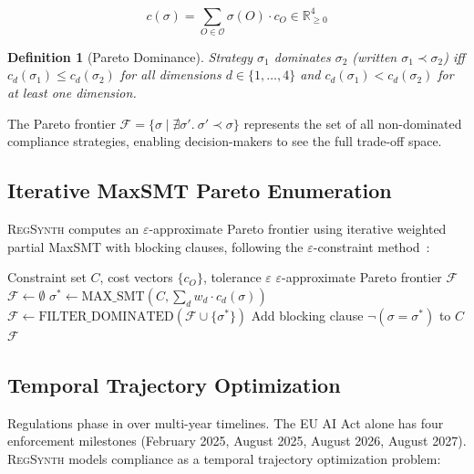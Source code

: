 \documentclass[11pt,twocolumn]{article}
\newtheorem{definition}{Definition}
\newcommand{\regsynth}{\textsc{RegSynth}}
\begin{document}
\[
c(\sigma) = \sum_{O \in \mathcal{O}} \sigma(O) \cdot c_O \in \mathbb{R}^4_{\geq 0}
\]

\begin{definition}[Pareto Dominance]
Strategy $\sigma_1$ \emph{dominates} $\sigma_2$ (written $\sigma_1 \prec \sigma_2$)
iff $c_d(\sigma_1) \leq c_d(\sigma_2)$ for all dimensions $d \in \{1,\ldots,4\}$
and $c_d(\sigma_1) < c_d(\sigma_2)$ for at least one dimension.
\end{definition}

The Pareto frontier $\mathcal{F} = \{\sigma \mid \nexists \sigma'.\ \sigma' \prec \sigma\}$
represents the set of all non-dominated compliance strategies, enabling
decision-makers to see the full trade-off space.

\subsection{Iterative MaxSMT Pareto Enumeration}

\regsynth{} computes an $\varepsilon$-approximate Pareto frontier using iterative
weighted partial MaxSMT with blocking clauses, following the $\varepsilon$-constraint
method~\cite{ehrgott2005,papadimitriou2000}:

\begin{algorithm}[t]
\caption{$\varepsilon$-Approximate Pareto Frontier via MaxSMT}
\label{alg:pareto}
\begin{algorithmic}[1]
\Require Constraint set $C$, cost vectors $\{c_O\}$, tolerance $\varepsilon$
\Ensure $\varepsilon$-approximate Pareto frontier $\mathcal{F}$
\State $\mathcal{F} \gets \emptyset$
  \State $\sigma^* \gets \text{MAX\_SMT}(C, \sum_d w_d \cdot c_d(\sigma))$
    \State $\mathcal{F} \gets \text{FILTER\_DOMINATED}(\mathcal{F} \cup \{\sigma^*\})$
  \EndIf
  \State Add blocking clause $\neg(\sigma = \sigma^*)$ to $C$
\EndFor
\State \Return $\mathcal{F}$
\end{algorithmic}
\end{algorithm}

\subsection{Temporal Trajectory Optimization}
\label{sec:temporal}

Regulations phase in over multi-year timelines. The EU AI Act alone has four
enforcement milestones (February 2025, August 2025, August 2026, August 2027).
\regsynth{} models compliance as a temporal trajectory optimization problem:
\end{document}
